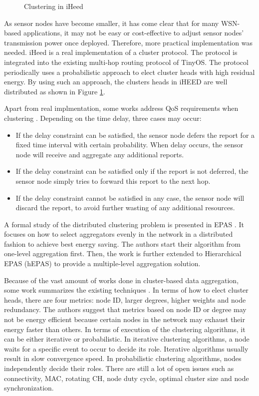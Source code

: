 \begin{figure}
\centering
{}
\caption{Clustering in iHeed}
\label{fig:iHeed}
\end{figure}

As sensor nodes have become smaller, it has come clear that for many WSN-based applications, it may not be easy or cost-effective to adjust sensor nodes' transmission power once deployed. Therefore, more practical implementation was needed. iHeed \cite{iheed} is a real implementation of a cluster protocol. The protocol is integrated into the existing multi-hop routing protocol of TinyOS. The protocol periodically uses a probabilistic approach to elect cluster heads with high residual energy. By using such an approach, the clusters heads in iHEED are well distributed as shown in Figure \ref{fig:iHeed}.

Apart from real implmentation, some works address QoS requirements when clustering \cite{qdap}. Depending on the time delay, three cases may occur:
\begin{itemize}
	\item If the delay constraint can be satisfied, the sensor node defers the report for a fixed time interval with certain probability. When delay occurs, the sensor node will receive and aggregate any additional reports.
	\item If the delay constraint can be satisfied only if the report is not deferred, the sensor node simply tries to forward this report to the next hop.
	\item If the delay constraint cannot be satisfied in any case, the sensor node will discard the report, to avoid further wasting of any additional resources.
\end{itemize}

A formal study of the distributed clustering problem is presented in EPAS \cite{epas}. It focuses on how to select aggregators evenly in the network in a distributed fashion to achieve best energy saving. The authors start their algorithm from one-level aggregation first. Then, the work is further extended to Hierarchical EPAS (hEPAS) to provide a multiple-level aggregation solution.

Because of the vast amount of works done in cluster-based data aggregation, some work summarizes the existing techniques \cite{clusteringsurvey}. In terms of how to elect cluster heads, there are four metrics: node ID, larger degrees, higher weights and node redundancy. The authors suggest that metrics based on node ID or degree may not be energy efficient because certain nodes in the network may exhaust their energy faster than others. In terms of execution of the clustering algorithms, it can be either iterative or probabilistic. In iterative clustering algorithms, a node waits for a specific event to occur to decide its role. Iterative algorithms usually result in slow convergence speed. In probabilistic clustering algorithms, nodes independently decide their roles. There are still a lot of open issues such as connectivity, MAC, rotating CH, node duty cycle, optimal cluster size and node synchronization.

